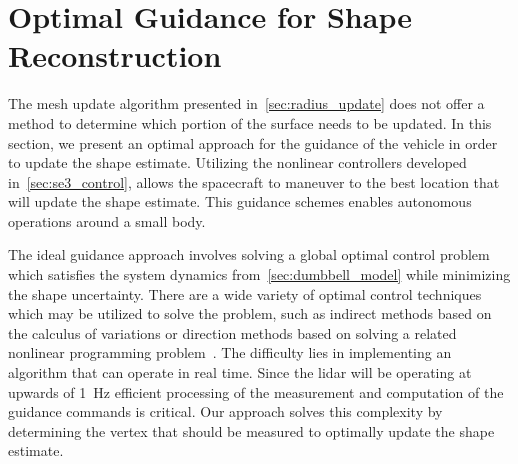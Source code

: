 \documentclass[letterpaper, paper,11pt]{AAS}		%
\begin{document}
\section{Optimal Guidance for Shape Reconstruction}\label{sec:explore_asteroid}

The mesh update algorithm presented in~\cref{sec:radius_update} does not offer a method to determine which portion of the surface needs to be updated. 
In this section, we present an optimal approach for the guidance of the vehicle in order to update the shape estimate.
Utilizing the nonlinear controllers developed in~\cref{sec:se3_control}, allows the spacecraft to maneuver to the best location that will update the shape estimate.
This guidance schemes enables autonomous operations around a small body.



The ideal guidance approach involves solving a global optimal control problem which satisfies the system dynamics from~\cref{sec:dumbbell_model} while minimizing the shape uncertainty.
There are a wide variety of optimal control techniques which may be utilized to solve the problem, such as indirect methods based on the calculus of variations or direction methods based on solving a related nonlinear programming problem~\cite{kirk2012,bryson1975}.
The difficulty lies in implementing an algorithm that can operate in real time.
Since the \gls{lidar} will be operating at upwards of \SI{1}{\hertz} efficient processing of the measurement and computation of the guidance commands is critical.
Our approach solves this complexity by determining the vertex that should be measured to optimally update the shape estimate.
\end{document}
